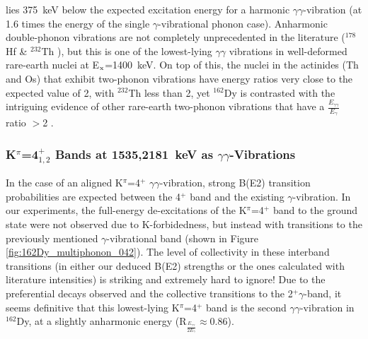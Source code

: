 lies 375~keV below the expected excitation energy for a harmonic $\gamma\gamma$-vibration (at 1.6 times the energy of the single $\gamma$-vibrational phonon case). Anharmonic double-phonon vibrations are not completely unprecedented in the literature ($^{178}$Hf \cite{Aprahamian2002} \& $^{232}$Th \cite{KORTEN_1993}), but this is one of the lowest-lying $\gamma\gamma$ vibrations in well-deformed rare-earth nuclei at E$_{\rm x}$=1400~keV. On top of this, the nuclei in the actinides (Th and Os) that exhibit two-phonon vibrations have energy ratios very close to the expected value of 2, with $^{232}$Th less than 2, yet $^{162}$Dy is contrasted with the intriguing evidence of other rare-earth two-phonon vibrations that have a $\frac{E_{\gamma\gamma}}{E_\gamma}$ ratio $>$2 \cite{Younes_170Er_conf_proc_gg}.


\subsubsection{K$^\pi$=4$^+_{1,2}$ Bands at 1535,2181~keV as $\gamma\gamma$-Vibrations}
In the case of an aligned K$^\pi$=4$^+$ $\gamma\gamma$-vibration, strong B(E2) transition probabilities are expected between the 4$^+$ band and the existing $\gamma$-vibration. In our experiments, the full-energy de-excitations of the K$^\pi$=4$^+$ band to the ground state were not observed due to K-forbidedness, but instead with transitions to the previously mentioned $\gamma$-vibrational band (shown in Figure \ref{fig:162Dy_multiphonon_042}). The level of collectivity in these interband transitions (in either our deduced B(E2) strengths or the ones calculated with literature intensities) is striking and extremely hard to ignore! Due to the preferential decays observed and the collective transitions to the 2$^+\gamma$-band, it seems definitive that this lowest-lying K$^\pi$=4$^+$ band is the second $\gamma\gamma$-vibration in $^{162}$Dy, at a slightly anharmonic energy (R$_{\frac{E_{\gamma\gamma}}{2E_\gamma}}\approx$0.86).

